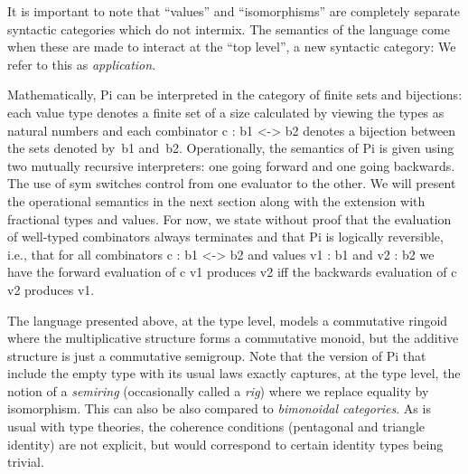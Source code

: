 \documentclass{llncs}
\newcommand{\jacques}[1]{\textsc{Jacques says:} #1}
\begin{document}
It is important to note that ``values'' and ``isomorphisms'' are completely
separate syntactic categories which do not intermix. The semantics of the
language come when these are made to interact at the ``top level'', a new
syntactic category:
\noindent We refer to this as \emph{application}.



Mathematically, {{Pi}} can be interpreted in the category of finite sets and
bijections: each value type denotes a finite set of a size calculated by
viewing the types as natural numbers and each combinator {{c : b1 <-> b2}}
denotes a bijection between the sets denoted by~{{b1}}
and~{{b2}}. Operationally, the semantics of {{Pi}} is given using two
mutually recursive interpreters: one going forward and one going
backwards. The use of {{sym}} switches control from one evaluator to the
other. We will present the operational semantics in the next section along
with the extension with fractional types and values. For now, we state
without proof that the evaluation of well-typed combinators always terminates
and that {{Pi}} is logically reversible, i.e., that for all combinators 
{{c : b1 <-> b2}} and values {{v1 : b1}} and {{v2 : b2}} we have the forward
evaluation of {{c v1}} produces {{v2}} iff the backwards evaluation of 
{{c v2}} produces {{v1}}.


The language presented above, at the type level, models a commutative ringoid
where the multiplicative structure forms a commutative monoid, but the
additive structure is just a commutative semigroup.  Note that the version of
{{Pi}} that include the empty type with its usual laws exactly captures, at
the type level, the notion of a \emph{semiring} (occasionally called a
\emph{rig}) where we replace equality by isomorphism.  This can also be also
compared to \emph{bimonoidal categories}.  As is usual with type theories,
the coherence conditions (pentagonal and triangle identity) are not explicit,
but would correspond to certain identity types being trivial.
\end{document}
